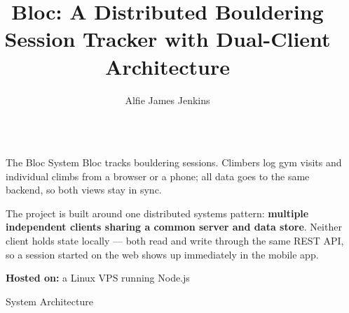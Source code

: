 \documentclass[final]{beamer}
\title{Bloc: A Distributed Bouldering Session Tracker with Dual-Client Architecture}
\author{Alfie James Jenkins}
\institute[shortinst]{Falmouth University -- COMP204 Distributed Systems}
\newlength{\sepwidth}
\newlength{\colwidth}
\newcommand{\separatorcolumn}{\begin{column}{\sepwidth}\end{column}}
\begin{document}
\begin{frame}[t,fragile]
\begin{columns}[t]
\separatorcolumn

\begin{column}{\colwidth}

  \begin{block}{The Bloc System}
    Bloc tracks bouldering sessions. Climbers log gym visits and individual
    climbs from a browser or a phone; all data goes to the same backend, so
    both views stay in sync.

    \vspace{0.15cm}
    The project is built around one distributed systems pattern:
    \textbf{multiple independent clients sharing a common server and data store}.
    Neither client holds state locally --- both read and write through the same
    REST API, so a session started on the web shows up immediately in the
    mobile app.

    \vspace{0.15cm}
    \textbf{Hosted on:} a Linux VPS running Node.js
  \end{block}

  \vspace{-0.7cm}
  \begin{block}{System Architecture}

    \begin{center}
\end{center}
\end{block}
\end{column}
\end{columns}
\end{frame}
\end{document}

